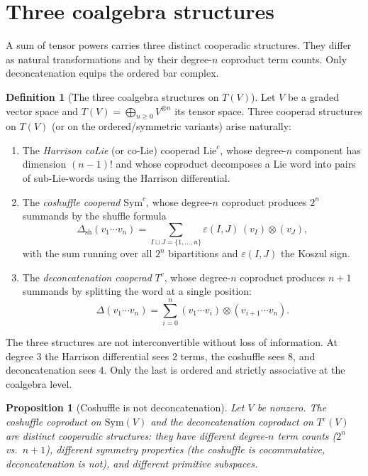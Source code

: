 \documentclass[11pt,reqno]{amsart}
\newtheorem{proposition}[theorem]{Proposition}
\theoremstyle{definition}
\newtheorem{definition}[theorem]{Definition}
\theoremstyle{remark}
\newcommand{\Sym}{\mathrm{Sym}}
\newcommand{\Lie}{\mathrm{Lie}}
\numberwithin{equation}{section}
\begin{document}
\section{Three coalgebra structures}
\label{sec:three-coalgebras}

A sum of tensor powers carries three distinct cooperadic
structures. They differ as natural transformations and by their
degree-$n$ coproduct term counts. Only deconcatenation equips the
ordered bar complex.

\begin{definition}[The three coalgebra structures on $T(V)$]
\label{def:three-coalgebras}
Let $V$ be a graded vector space and $T(V) = \bigoplus_{n\geq 0}
V^{\otimes n}$ its tensor space. Three cooperad structures on
$T(V)$ (or on the ordered/symmetric variants) arise naturally:
\begin{enumerate}[label=\textup{(\roman*)}]
\item The \emph{Harrison coLie} (or co-Lie) cooperad
 $\Lie^{c}$, whose degree-$n$ component has dimension $(n-1)!$ and
 whose coproduct decomposes a Lie word into pairs of sub-Lie-words
 using the Harrison differential.
\item The \emph{coshuffle cooperad} $\Sym^{c}$, whose degree-$n$
 coproduct produces $2^{n}$ summands by the shuffle formula
 \[
 \Delta_{\mathrm{sh}}(v_{1}\cdots v_{n})
 = \sum_{I\sqcup J = \{1,\ldots,n\}}
 \varepsilon(I,J)\,
 (v_{I}) \otimes (v_{J}),
 \]
 with the sum running over all $2^{n}$ bipartitions and
 $\varepsilon(I,J)$ the Koszul sign.
\item The \emph{deconcatenation cooperad} $T^{c}$, whose degree-$n$
 coproduct produces $n+1$ summands by splitting the word at a
 single position:
 \[
 \Delta(v_{1}\cdots v_{n})
 = \sum_{i=0}^{n}
 (v_{1}\cdots v_{i}) \otimes (v_{i+1}\cdots v_{n}).
 \]
\end{enumerate}
\end{definition}

The three structures are not interconvertible without loss of
information. At degree $3$ the Harrison differential sees
$2$ terms, the coshuffle sees $8$, and deconcatenation sees $4$.
Only the last is ordered and strictly associative at the
coalgebra level.

\begin{proposition}[Coshuffle is not deconcatenation]
\label{prop:coshuffle-not-deconcat}
Let $V$ be nonzero. The coshuffle coproduct on $\Sym(V)$ and the
deconcatenation coproduct on $T^{c}(V)$ are distinct cooperadic
structures: they have different degree-$n$ term counts
($2^{n}$ vs.\ $n+1$), different symmetry properties
(the coshuffle is cocommutative, deconcatenation is not), and
different primitive subspaces.
\end{proposition}
\end{document}

